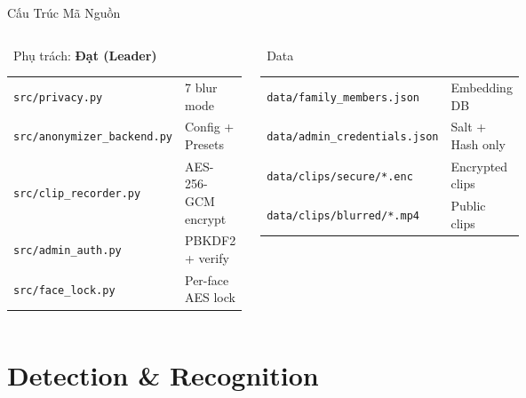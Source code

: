 \documentclass[aspectratio=169, 12pt]{beamer}
\newcommand{\filecode}[1]{\texttt{\textcolor{primary}{\small #1}}}
\begin{document}
\begin{frame}{Cấu Trúc Mã Nguồn}
\begin{columns}[T]
\begin{block}{\faPython\ Phụ trách: \textcolor{accent}{\textbf{Đạt (Leader)}}}
\footnotesize
\begin{tabular}{ll}
\filecode{src/privacy.py} & 7 blur mode \\
\filecode{src/anonymizer\_backend.py} & Config + Presets \\
\filecode{src/clip\_recorder.py} & AES-256-GCM encrypt \\
\filecode{src/admin\_auth.py} & PBKDF2 + verify \\
\filecode{src/face\_lock.py} & Per-face AES lock \\
\end{tabular}
\end{block}

\begin{block}{\faDatabase\ Data}
\footnotesize
\begin{tabular}{ll}
\filecode{data/family\_members.json} & Embedding DB \\
\filecode{data/admin\_credentials.json} & Salt + Hash only \\
\filecode{data/clips/secure/*.enc} & Encrypted clips \\
\filecode{data/clips/blurred/*.mp4} & Public clips \\
\end{tabular}
\end{block}
\end{columns}
\end{frame}


\section{Detection \& Recognition}
\end{document}

